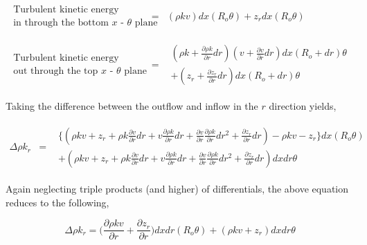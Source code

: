 \begin{displaymath}
	\begin{array}{ccc}
		\begin{array}{c}
			\textrm{Turbulent kinetic energy} \\ \textrm{in through the bottom $x$ - $\theta$ plane} 
		\end{array} & 
	= & (\rho k v)dx(R_o \theta) + z_r dx(R_o \theta)\\
	& \\ & \\
		\begin{array}{c}
			\textrm{Turbulent kinetic energy} \\ \textrm{out through the top $x$ - $\theta$ plane}
		\end{array} & 
	= & \begin{array}{c}
		(\rho k + \frac{\partial \rho k}{\partial r}dr)(v + \frac{\partial v}{\partial r}dr)dx
		(R_o + dr) \theta  \\
	+ (z_r + \frac{\partial z_r}{\partial r}dr)dx (R_o + dr) \theta
		\end{array}
	\end{array}
\end{displaymath}

	Taking the difference between the outflow and inflow in the $r$ direction yields,

\begin{displaymath}
	\begin{array}{ccc}
	\Delta \rho k_r & = &
		\begin{array}{c} 
	\Big\{(\rho k v + z_r + \rho k \frac{\partial v}{\partial r}dr + v \frac{\partial \rho k}
	{\partial r}dr + \frac{\partial v}{\partial r} \frac{\partial \rho k}{\partial r}dr^2 + \frac{\partial z_r}
	{\partial r}dr) -\rho k v - z_r\Big\} dx(R_o \theta) \\
	+ (\rho k v + z_r + \rho k \frac{\partial v}{\partial r}dr + v \frac{\partial \rho k}
	{\partial r}dr + \frac{\partial v}{\partial r} \frac{\partial \rho k}{\partial r}dr^2 + \frac{\partial z_r}
	{\partial r}dr) dx dr \theta
		\end{array}
	\end{array}
\end{displaymath}

	Again neglecting triple products (and higher) of differentials, the above equation reduces to the following,

\begin{displaymath}
	\Delta \rho k_r = \Big( \frac{\partial \rho k v}{\partial r} + \frac{\partial z_r}{\partial r}
	\Big)dxdr(R_o \theta) + (\rho k v + z_r)dxdr\theta
\end{displaymath}

